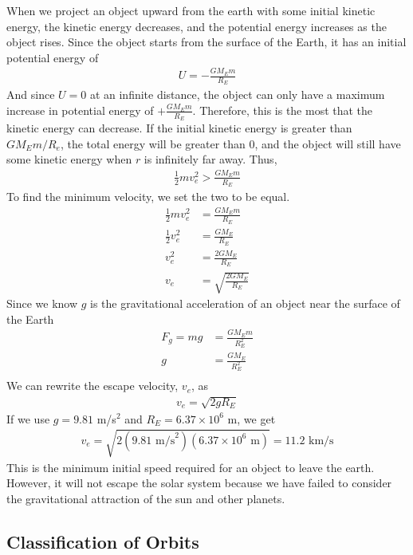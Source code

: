 \documentclass[11pt]{article}
\begin{document}
When we project an object upward from the earth with some initial kinetic energy, the kinetic energy decreases, and the potential energy increases as the object rises. Since the object starts from the surface of the Earth, it has an initial potential energy of 
\begin{align*}
    U = - \frac{GM_E m}{R_E}
\end{align*}
And since $U = 0$ at an infinite distance, the object can only have a maximum increase in potential energy of $+ \frac{GM_E m}{R_E}$. Therefore, this is the most that the kinetic energy can decrease. If the initial kinetic energy is greater than $GM_E m / R_e$, the total energy will be greater than 0, and the object will still have some kinetic energy when $r$ is infinitely far away. Thus,
\begin{align*}
    \frac{1}{2}mv_e^2 > \frac{GM_E m}{R_E}
\end{align*}
To find the minimum velocity, we set the two to be equal.
\begin{align*}
    \frac{1}{2}mv_e^2 &= \frac{GM_E m}{R_E} \\
    \frac{1}{2}v_e^2 &= \frac{GM_E}{R_E} \\
    v_e^2 &= \frac{2GM_E}{R_E} \\
    v_e &= \sqrt{\frac{2GM_E}{R_E}}
\end{align*}
Since we know $g$ is the gravitational acceleration of an object near the surface of the Earth
\begin{align*}
    F_g = mg &= \frac{GM_E m}{R_E^2} \\
    g &= \frac{GM_E}{R_E^2} \\
\end{align*}
We can rewrite the escape velocity, $v_e$, as
\begin{align*}
    v_e = \sqrt{2gR_E}
\end{align*}
If we use $g = 9.81$ m/s$^2$ and $R_E = 6.37 \times 10^6$ m, we get
\begin{align*}
    v_e  = \sqrt{2(9.81 \text{ m/s}^2)(6.37 \times 10^6 \text{ m})} = 11.2 \text{ km/s}
\end{align*}
This is the minimum initial speed required for an object to leave the earth. However, it will not escape the solar system because we have failed to consider the gravitational attraction of the sun and other planets.

\subsection{Classification of Orbits}
\end{document}
